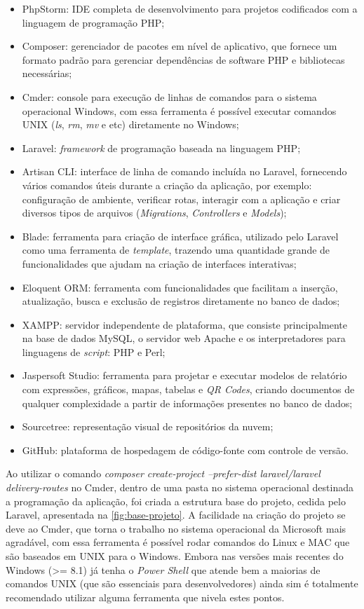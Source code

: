 \begin{itemize}
    \item PhpStorm: IDE completa de desenvolvimento para projetos codificados com a linguagem de programação PHP;
    \item Composer: gerenciador de pacotes em nível de aplicativo, que fornece um formato padrão para gerenciar dependências de software PHP e bibliotecas necessárias;
    \item Cmder: console para execução de linhas de comandos para o sistema operacional Windows, com essa ferramenta é possível executar comandos UNIX (\textit{ls}, \textit{rm}, \textit{mv} e etc) diretamente no Windows;
    \item Laravel: \textit{framework} de programação baseada na linguagem PHP;
    \item Artisan CLI: interface de linha de comando incluída no Laravel, fornecendo vários comandos úteis durante a criação da aplicação, por exemplo: configuração de ambiente, verificar rotas, interagir com a aplicação e criar diversos tipos de arquivos (\textit{Migrations}, \textit{Controllers} e \textit{Models});
    \item Blade: ferramenta para criação de interface gráfica, utilizado pelo Laravel como uma ferramenta de \textit{template}, trazendo uma quantidade grande de funcionalidades que ajudam na criação de interfaces interativas;
    \item Eloquent ORM: ferramenta com funcionalidades que facilitam a inserção, atualização, busca e exclusão de registros diretamente no banco de dados;
    \item XAMPP: servidor independente de plataforma, que consiste principalmente na base de dados MySQL, o servidor web Apache e os interpretadores para linguagens de \textit{script}: PHP e Perl;
    \item Jaspersoft Studio: ferramenta para projetar e executar modelos de relatório com  expressões, gráficos, mapas, tabelas e \textit{QR Codes}, criando documentos de qualquer complexidade a partir de informações presentes no banco de dados;
    \item Sourcetree: representação visual de repositórios da nuvem;
    \item GitHub: plataforma de hospedagem de código-fonte com controle de versão.
\end{itemize}

\newpage
Ao utilizar o comando \textit{composer create-project --prefer-dist laravel/laravel delivery-routes} no Cmder, dentro de uma pasta no sistema operacional destinada a programação da aplicação, foi criada a estrutura base do projeto, cedida pelo Laravel, apresentada na \autoref{fig:base-projeto}. A facilidade na criação do projeto se deve ao Cmder, que torna o trabalho no sistema operacional da Microsoft mais agradável, com essa ferramenta é possível rodar comandos do Linux e MAC que são baseados em UNIX para o Windows. Embora nas versões mais recentes do Windows (>= 8.1) já tenha o \textit{Power Shell} que atende bem a maiorias de comandos UNIX (que são essenciais para desenvolvedores) ainda sim é totalmente recomendado utilizar alguma ferramenta que nivela estes pontos.

